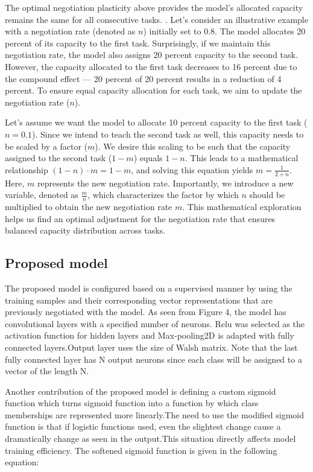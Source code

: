 \documentclass{article}
\begin{document}
The optimal negotiation plasticity above provides the model's allocated capacity remains the same for all consecutive tasks. 
 \cite{hadsell2020embracing}. Let's consider an illustrative example with a negotiation rate (denoted as $n$) initially set to 0.8. The model allocates 20 percent of its capacity to the first task. Surprisingly, if we maintain this negotiation rate, the model also assigns 20 percent capacity to the second task. However, the capacity allocated to the first task decreases to 16 percent due to the compound effect — 20 percent of 20 percent results in a reduction of 4 percent. To ensure equal capacity allocation for each task, we aim to update the negotiation rate ($n$).

Let's assume we want the model to allocate 10 percent capacity to the first task ($n = 0.1$). Since we intend to teach the second task as well, this capacity needs to be scaled by a factor ($m$). We desire this scaling to be such that the capacity assigned to the second task ($1 - m$) equals $1 - n$. This leads to a mathematical relationship $(1 - n) \cdot m = 1 - m$, and solving this equation yields $m = \frac{1}{{2 + n}}$. Here, $m$ represents the new negotiation rate. Importantly, we introduce a new variable, denoted as $\frac{m}{n}$, which characterizes the factor by which $n$ should be multiplied to obtain the new negotiation rate $m$. This mathematical exploration helps us find an optimal adjustment for the negotiation rate that ensures balanced capacity distribution across tasks.


\subsection{Proposed model} 

The proposed model is configured based on a supervised manner by using the training samples and their corresponding vector representations that are previously negotiated with the model. As seen from Figure 4, the model has convolutional layers with a specified number of neurons. Relu was selected as the activation function for hidden layers and Max-pooling2D is adapted with fully connected layers.Output layer uses the  size of Walsh matrix.  Note that the last fully connected layer has N output neurons since each class will be assigned to a vector of the length N. 

Another contribution of the proposed model is defining a custom sigmoid function which turns sigmoid function into a function by which 
class memberships are represented more linearly.The need to use the modified sigmoid function is that if logistic functions used, even the slightest change cause a dramatically change as seen in the output.This situation directly affects model training efficiency. The softened sigmoid function is given in the following equation:
\end{document}
